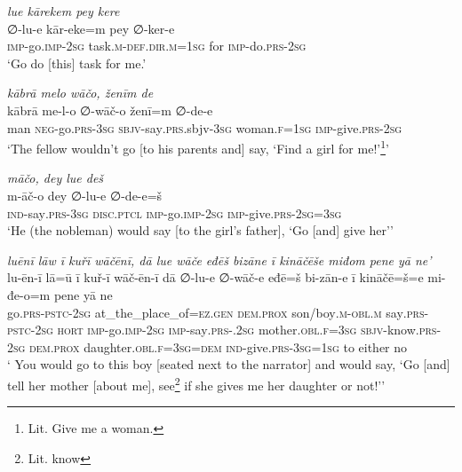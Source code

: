 \ea \label{RE.20}
\textit{lue kārekem pey kere} \\ 
\gll ∅-lu-e kār-eke=m pey ∅-ker-e \\ 
 \textsc{imp-}go.\textsc{imp-}\textsc{2sg} task\textsc{.m}\textsc{-def}\textsc{.dir}\textsc{.m}\textsc{=\textsc{1sg}} for \textsc{imp-}do\textsc{.prs}-\textsc{2sg} \\ 
\glt `Go do [this] task for me.'
\z 
 
\ea \label{RE.29}
\textit{kābrā melo wāčo, ženīm de} \\ 
\gll kābrā me-l-o ∅-wāč-o ženī=m ∅-de-e \\ 
 man \textsc{neg-}go\textsc{.prs}\textsc{-3sg} \textsc{sbjv-}say\textsc{.prs}.sbjv\textsc{-3sg} woman\textsc{.f}\textsc{=\textsc{1sg}} \textsc{imp-}give\textsc{.prs}-\textsc{2sg} \\ 
\glt `The fellow wouldn’t go [to his parents and] say, ‘Find a girl for me!’\footnote{Lit. Give me a woman.}'
\z 
 
\ea \label{RE.55}
\textit{māčo, dey lue deš} \\ 
\gll m-āč-o dey ∅-lu-e ∅-de-e=š \\ 
 \textsc{ind-}say\textsc{.prs}\textsc{-3sg} \textsc{disc.ptcl} \textsc{imp-}go.\textsc{imp-}\textsc{2sg} \textsc{imp-}give\textsc{.prs}-\textsc{2sg}\textsc{=3sg} \\ 
\glt `He (the nobleman) would say [to the girl’s father], ‘Go [and] give her’'
\z 
 
\ea \label{ŽE.74}
\textit{luēnī lāw ī kuřī wāčēnī, dā lue wāče eđēš bizāne ī kināčēše miđom pene yā ne’} \\ 
\gll lu-ēn-ī lā=ū ī kuř-ī wāč-ēn-ī dā ∅-lu-e ∅-wāč-e eđē=š bi-zān-e ī kināčē=š=e mi-đe-o=m pene yā ne \\ 
 go\textsc{.prs}\textsc{-pstc}-\textsc{2sg} at\_the\_place\_of\textsc{\textsc{=ez.gen}} \textsc{dem.prox} son/boy\textsc{.m}\textsc{-obl}\textsc{.m} say\textsc{.prs}\textsc{-pstc}-\textsc{2sg} \textsc{hort} \textsc{imp-}go.\textsc{imp-}\textsc{2sg} \textsc{imp-}say\textsc{.prs-}.\textsc{2sg} mother\textsc{.obl}\textsc{.f}\textsc{=3sg} \textsc{sbjv-}know\textsc{.prs}-\textsc{2sg} \textsc{dem.prox} daughter\textsc{.obl}\textsc{.f}\textsc{=3sg}\textsc{=dem} \textsc{ind-}give\textsc{.prs}\textsc{-3sg}\textsc{=\textsc{1sg}} to either no \\ 
\glt ` You would go to this boy [seated next to the narrator] and would say, ‘Go [and] tell her mother [about me], see\footnote{Lit. know} if she gives me her daughter or not!’'
\z 
 
